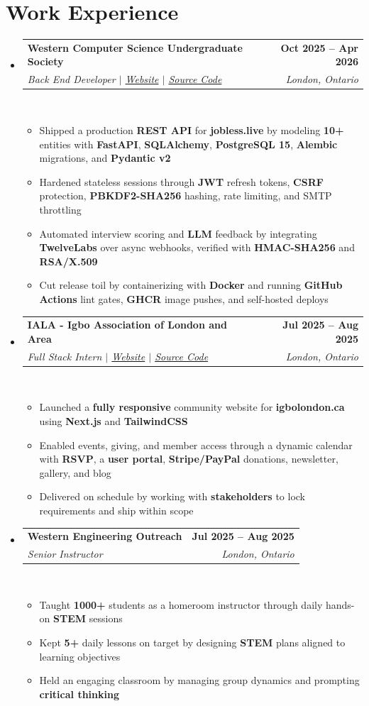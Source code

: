\documentclass[letterpaper,10pt]{article}
\makeatletter
\newcommand{\resumeItem}[1]{
  \item\small{
    {#1 \vspace{0pt}}
  }
}
\newcommand{\resumeSubheading}[4]{
  \vspace{-1pt}\item
    \begin{tabular*}{1.0\textwidth}[t]{l@{\extracolsep{\fill}}r}
      \textbf{#1} & \textbf{\small #2} \\
      \textit{\small#3} & \textit{\small #4} \\
    \end{tabular*}\vspace{1.5pt}
}
\newcommand{\resumeSubHeadingListStart}{\begin{itemize}[leftmargin=0.0in, label={}, itemsep=2pt, parsep=0pt, topsep=0pt, partopsep=0pt]}
\newcommand{\resumeSubHeadingListEnd}{\end{itemize}\vspace{0pt}}
\newcommand{\resumeItemListStart}{\begin{itemize}[itemsep=0.6pt, parsep=0pt, topsep=0.4pt, partopsep=0pt]}
\newcommand{\resumeItemListEnd}{\end{itemize}\vspace{-1pt}}
\makeatother
\begin{document}
\section{Work Experience}
    \resumeSubHeadingListStart
            \resumeSubheading{Western Computer Science Undergraduate Society}{Oct 2025 -- Apr 2026}{Back End Developer $|$ \emph{\href{https://www.jobless.live/}{Website}} $|$ \emph{\href{https://github.com/Western-CSUS-2025-2026/CSUS-Project-25-26}{Source Code}}}{London, Ontario}
            \\[1mm]
                \resumeItemListStart
                    \resumeItem{Shipped a production \textbf{REST API} for \textbf{jobless.live} by modeling \textbf{10+} entities with \textbf{FastAPI}, \textbf{SQLAlchemy}, \textbf{PostgreSQL 15}, \textbf{Alembic} migrations, and \textbf{Pydantic v2}}
                    \resumeItem{Hardened stateless sessions through \textbf{JWT} refresh tokens, \textbf{CSRF} protection, \textbf{PBKDF2-SHA256} hashing, rate limiting, and SMTP throttling}
                    \resumeItem{Automated interview scoring and \textbf{LLM} feedback by integrating \textbf{TwelveLabs} over async webhooks, verified with \textbf{HMAC-SHA256} and \textbf{RSA/X.509}}
                    \resumeItem{Cut release toil by containerizing with \textbf{Docker} and running \textbf{GitHub Actions} lint gates, \textbf{GHCR} image pushes, and self-hosted deploys}
                \resumeItemListEnd
 \vspace{2pt}
            \resumeSubheading{IALA - Igbo Association of London and Area}{Jul 2025 -- Aug 2025}{Full Stack Intern $|$ \emph{\href{https://igbolondon.ca/}{Website}} $|$ \emph{\href{https://github.com/igbolondon/iala}{Source Code}}}{London, Ontario}
            \\[1mm]
                \resumeItemListStart
                    \resumeItem{Launched a \textbf{fully responsive} community website for \textbf{igbolondon.ca} using \textbf{Next.js} and \textbf{TailwindCSS}}
                    \resumeItem{Enabled events, giving, and member access through a dynamic calendar with \textbf{RSVP}, a \textbf{user portal}, \textbf{Stripe/PayPal} donations, newsletter, gallery, and blog}
                    \resumeItem{Delivered on schedule by working with \textbf{stakeholders} to lock requirements and ship within scope}
                    \resumeItemListEnd
 \vspace{2pt}
            \resumeSubheading{Western Engineering Outreach}{Jul 2025 -- Aug 2025}{Senior Instructor}{London, Ontario}
            \\[1mm]
                \resumeItemListStart
                    \resumeItem{Taught \textbf{1000+} students as a homeroom instructor through daily hands-on \textbf{STEM} sessions}
                    \resumeItem{Kept \textbf{5+} daily lessons on target by designing \textbf{STEM} plans aligned to learning objectives}
                    \resumeItem{Held an engaging classroom by managing group dynamics and prompting \textbf{critical thinking}}
                    \resumeItemListEnd
    \resumeSubHeadingListEnd
    \vspace{-6pt}
\end{document}

